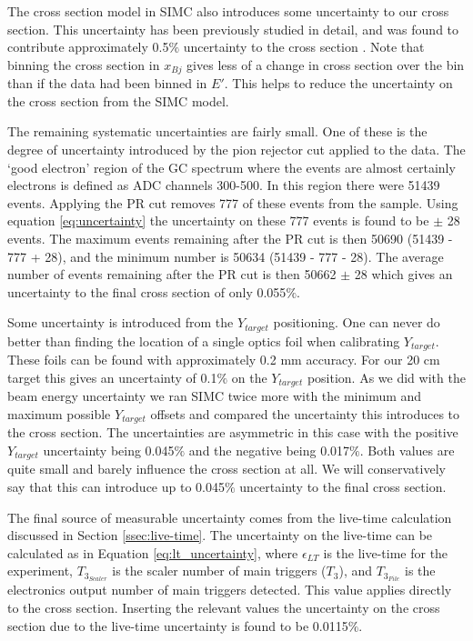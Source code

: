 The cross section model in SIMC also introduces some uncertainty to our cross section. This uncertainty has been previously studied in detail, and was found to contribute approximately 0.5$\%$ uncertainty to the cross section \cite{Thesis:Nguyen}. Note that binning the cross section in $x_{Bj}$ gives less of a change in cross section over the bin than if the data had been binned in $E'$. This helps to reduce the uncertainty on the cross section from the SIMC model.

The remaining systematic uncertainties are fairly small. One of these is the degree of uncertainty introduced by the pion rejector cut applied to the data. The `good electron' region of the GC spectrum where the events are almost certainly electrons is defined as ADC channels 300-500. In this region there were 51439 events. Applying the PR cut removes 777 of these events from the sample. Using equation \ref{eq:uncertainty} the uncertainty on these 777 events is found to be $\pm$ 28 events. The maximum events remaining after the PR cut is then 50690 (51439 - 777 + 28), and the minimum number is 50634 (51439 - 777 - 28). The average number of events remaining after the PR cut is then 50662 $\pm$ 28 which gives an uncertainty to the final cross section of only 0.055$\%$.

Some uncertainty is introduced from the $Y_{target}$ positioning. One can never do better than finding the location of a single optics foil when calibrating $Y_{target}$. These foils can be found with approximately 0.2 mm accuracy. For our 20 cm target this gives an uncertainty of 0.1$\%$ on the $Y_{target}$ position. As we did with the beam energy uncertainty we ran SIMC twice more with the minimum and maximum possible $Y_{target}$ offsets and compared the uncertainty this introduces to the cross section. The uncertainties are asymmetric in this case with the positive $Y_{target}$ uncertainty being 0.045$\%$ and the negative being 0.017$\%$. Both values are quite small and barely influence the cross section at all. We will conservatively say that this can introduce up to 0.045$\%$ uncertainty to the final cross section. 

The final source of measurable uncertainty comes from the live-time calculation discussed in Section \ref{ssec:live-time}. The uncertainty on the live-time can be calculated as in Equation \ref{eq:lt_uncertainty}, where $\epsilon_{LT}$ is the live-time for the experiment, $T_{3_{Scaler}}$ is the scaler number of main triggers ($T_3$), and $T_{3_{File}}$ is the electronics output number of main triggers detected. This value applies directly to the cross section. Inserting the relevant values the uncertainty on the cross section due to the live-time uncertainty is found to be 0.0115$\%$.%


